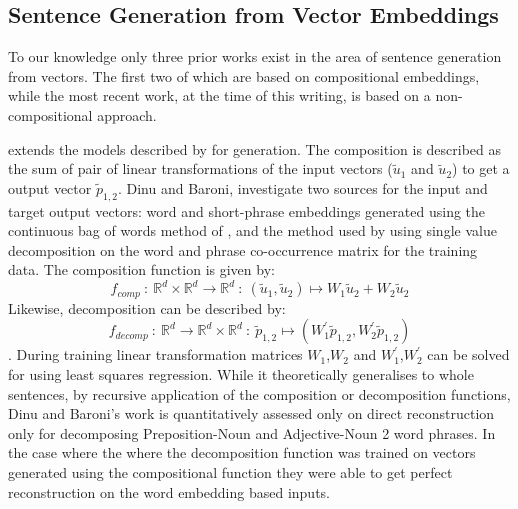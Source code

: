 \documentclass[11pt]{article}
\theoremstyle{plain}
\theoremstyle{definition}
\begin{document}
\subsection{Sentence Generation from Vector Embeddings}

To our knowledge only three prior works exist in the area of sentence generation from vectors. The first two of which are based on compositional embeddings, while the most recent work, at the time of this writing, is based on a non-compositional approach.

\newcommand{\p}{\tilde{p}_{1,2}}
\renewcommand{\u}{\tilde{u}}


\textcite{Dinu2014CompositionalGeneration}  extends the models described by \textcite{zanzotto2010estimating, Guevara2010} for generation. The composition is described as the sum of pair of linear transformations of the input vectors ($\u_1$ and $\u_2$) to get a output vector $\p$. Dinu and Baroni, investigate two sources for the input and target output vectors: word and short-phrase embeddings generated using the continuous bag of words method of \cite{mikolov2013efficient}, and the method used by \textcite{Guevara2010} using single value decomposition on the word and phrase co-occurrence matrix for the training data. The composition function is given by:  $$f_{comp}\::\:\mathbb{R}^d\times\mathbb{R}^d \to \mathbb{R}^d\::\: (\u_1, \u_2)\mapsto W_1\u_2+W_2\u_2$$
Likewise, decomposition can be described by: $$f_{decomp}\::\:\mathbb{R}^d\to \mathbb{R}^d\times\mathbb{R}^d \::\: \p \mapsto (W^\prime_1\p, W^\prime_2\p)$$.
During training linear transformation matrices $W_1$,$W_2$ and $W_1^\prime$,$W_2^\prime$ can be solved for using least squares regression.
While it theoretically generalises to whole sentences, by recursive application of the composition or decomposition functions, Dinu and Baroni's work is quantitatively assessed only on direct reconstruction only for decomposing Preposition-Noun and Adjective-Noun 2 word phrases. In the case where the  where the decomposition function was trained on vectors generated using the compositional function they were able to get perfect reconstruction on the word embedding based inputs.

\renewcommand{\p}{\tilde{p}}
\end{document}
